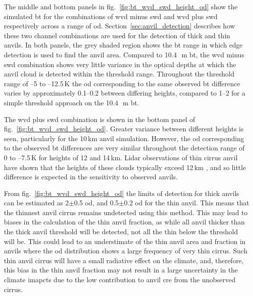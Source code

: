 The middle and bottom panels in fig.~\ref{fig:bt_wvd_swd_height_od} show the simulated \acrshort{bt} for the combinations of \acrshort{wvd} minus \acrshort{swd} and \acrshort{wvd} plus \acrshort{swd} respectively across a range of \acrshort{od}.
Section~\ref{sec:anvil_detection} describes how these two channel combinations are used for the detection of thick and thin anvils.
In both panels, the grey shaded region shows the \acrshort{bt} range in which edge detection is used to find the anvil area.
Compared to 10.4\,\unit{\mu m} \acrshort{bt}, the \acrshort{wvd} minus \acrshort{swd} combination shows very little variance in the optical depths at which the anvil cloud is detected within the threshold range.
Throughout the threshold range of --5 to --12.5\,\unit{K} the \acrshort{od} corresponding to the same observed \acrshort{bt} difference varies by approximately 0.1--0.2 between differing heights, compared to 1--2 for a simple threshold approach on the 10.4\,\unit{\mu m} \acrshort{bt}.

The \acrshort{wvd} plus \acrshort{swd} combination is shown in the bottom panel of fig.~\ref{fig:bt_wvd_swd_height_od}.
Greater variance between different heights is seen, particularly for the 10\,\unit{km} anvil simulation.
However, the \acrshort{od} corresponding to the observed \acrshort{bt} differences are very similar throughout the detection range of 0 to --7.5\,\unit{K} for heights of 12 and 14\,\unit{km}.
Lidar observations of thin cirrus anvil have shown that the heights of these clouds typically exceed 12\,\unit{km} \citep{wall_observational_2020, horner_evolution_2023}, and so little difference is expected in the sensitivity to observed anvils.

From fig.~\ref{fig:bt_wvd_swd_height_od} the limits of detection for thick anvils can be estimated as 2$\pm$0.5 \acrshort{od}, and 0.5$\pm$0.2 \acrshort{od} for the thin anvil.
This means that the thinnest anvil cirrus remains undetected \citep{berry_cloud_2014} using this method.
This may lead to biases in the calculation of the thin anvil fraction, as while all anvil thicker than the thick anvil threshold will be detected, not all the thin below the threshold will be.
This could lead to an understimate of the thin anvil area and fraction in anvils where the \acrshort{od} distribution shows a large frequency of very thin cirrus.
Such thin anvil cirrus will have a small radiative effect on the climate, and, therefore, this bias in the thin anvil fraction may not result in a large uncertainty in the climate imapcts due to the low contribution to anvil \acrshort{cre} from the unobserved cirrus.

